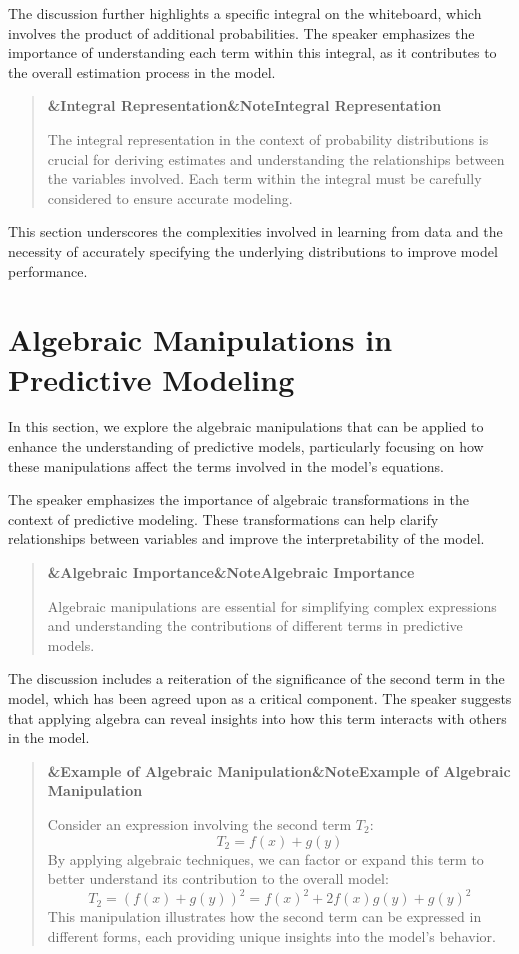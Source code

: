 \documentclass[a4paper]{article}
\newcommand{\boxheading}[1]{%
  \par\smallskip
  \noindent\textbf{\ifx&#1&Note\else#1\fi}\par
  \smallskip
}
\newenvironment{exbox}[1][]{%
  \begin{quote}\color{brown!70!black}\boxheading{#1}\normalcolor
}{\end{quote}}
\newenvironment{rembox}[1][]{%
  \begin{quote}\color{black!70}\boxheading{#1}\normalcolor
}{\end{quote}}
\begin{document}
The discussion further highlights a specific integral on the whiteboard, which involves the product of additional probabilities. The speaker emphasizes the importance of understanding each term within this integral, as it contributes to the overall estimation process in the model.

\begin{exbox}[Integral Representation]
The integral representation in the context of probability distributions is crucial for deriving estimates and understanding the relationships between the variables involved. Each term within the integral must be carefully considered to ensure accurate modeling.
\end{exbox}

This section underscores the complexities involved in learning from data and the necessity of accurately specifying the underlying distributions to improve model performance.

\section{Algebraic Manipulations in Predictive Modeling}
In this section, we explore the algebraic manipulations that can be applied to enhance the understanding of predictive models, particularly focusing on how these manipulations affect the terms involved in the model's equations.

The speaker emphasizes the importance of algebraic transformations in the context of predictive modeling. These transformations can help clarify relationships between variables and improve the interpretability of the model. 

\begin{rembox}[Algebraic Importance]
Algebraic manipulations are essential for simplifying complex expressions and understanding the contributions of different terms in predictive models.
\end{rembox}

The discussion includes a reiteration of the significance of the second term in the model, which has been agreed upon as a critical component. The speaker suggests that applying algebra can reveal insights into how this term interacts with others in the model.

\begin{exbox}[Example of Algebraic Manipulation]
Consider an expression involving the second term \( T_2 \):
\[
T_2 = f(x) + g(y)
\]
By applying algebraic techniques, we can factor or expand this term to better understand its contribution to the overall model:
\[
T_2 = (f(x) + g(y))^2 = f(x)^2 + 2f(x)g(y) + g(y)^2
\]
This manipulation illustrates how the second term can be expressed in different forms, each providing unique insights into the model's behavior.
\end{exbox}
\end{document}
